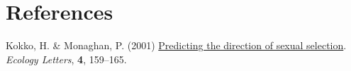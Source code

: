 \documentclass[
]{article}
\newlength{\cslhangindent}
\newlength{\cslentryspacingunit} %
\newenvironment{CSLReferences}[2] %
 {%
  \setlength{\parindent}{0pt}
  \ifodd #1
  \let\oldpar\par
  \def\par{\hangindent=\cslhangindent\oldpar}
  \fi
  \setlength{\parskip}{#2\cslentryspacingunit}
 }%
 {}
\begin{document}
\captionsetup{labelformat=default}

\clearpage

\hypertarget{references}{%
\section*{References}\label{references}}

\hypertarget{refs}{}
\begin{CSLReferences}{0}{0}
\leavevmode{}%
Kokko, H. \& Monaghan, P. (2001)
\href{https://doi.org/10.1046/j.1461-0248.2001.00212.x}{{Predicting the
direction of sexual selection}}. \emph{Ecology Letters}, \textbf{4},
159--165.

\end{CSLReferences}
\end{document}
